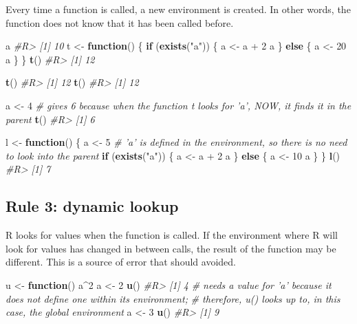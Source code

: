 \documentclass[]{book}
\newenvironment{Shaded}{}{}
\newcommand{\CommentTok}[1]{\textcolor[rgb]{0.38,0.63,0.69}{\textit{#1}}}
\newcommand{\ControlFlowTok}[1]{\textcolor[rgb]{0.00,0.44,0.13}{\textbf{#1}}}
\newcommand{\DecValTok}[1]{\textcolor[rgb]{0.25,0.63,0.44}{#1}}
\newcommand{\KeywordTok}[1]{\textcolor[rgb]{0.00,0.44,0.13}{\textbf{#1}}}
\newcommand{\NormalTok}[1]{#1}
\newcommand{\OperatorTok}[1]{\textcolor[rgb]{0.40,0.40,0.40}{#1}}
\newcommand{\StringTok}[1]{\textcolor[rgb]{0.25,0.44,0.63}{#1}}
\theoremstyle{definition}
\theoremstyle{definition}
\theoremstyle{definition}
\theoremstyle{remark}
\begin{document}
Every time a function is called, a new environment is created. In other
words, the function does not know that it has been called before.

\begin{Shaded}
\begin{Highlighting}[]
\NormalTok{a }
\CommentTok{#R> [1] 10}
\NormalTok{t <-}\StringTok{ }\ControlFlowTok{function}\NormalTok{() \{}
  \ControlFlowTok{if}\NormalTok{ (}\KeywordTok{exists}\NormalTok{(}\StringTok{"a"}\NormalTok{)) \{ }
\NormalTok{    a <-}\StringTok{ }\NormalTok{a }\OperatorTok{+}\StringTok{ }\DecValTok{2}
\NormalTok{    a}
\NormalTok{  \} }\ControlFlowTok{else}\NormalTok{ \{}
\NormalTok{    a <-}\StringTok{ }\DecValTok{20} 
\NormalTok{    a}
\NormalTok{  \} }
\NormalTok{\}}
\KeywordTok{t}\NormalTok{()}
\CommentTok{#R> [1] 12}

\KeywordTok{t}\NormalTok{()}
\CommentTok{#R> [1] 12}
\KeywordTok{t}\NormalTok{()}
\CommentTok{#R> [1] 12}

\NormalTok{a <-}\StringTok{ }\DecValTok{4}
\CommentTok{# gives 6 because when the function t looks for 'a', NOW, it finds it in the parent }
\KeywordTok{t}\NormalTok{() }
\CommentTok{#R> [1] 6}


\NormalTok{l <-}\StringTok{ }\ControlFlowTok{function}\NormalTok{() \{}
\NormalTok{  a <-}\StringTok{ }\DecValTok{5} 
  \CommentTok{# 'a' is defined in the environment, so there is no need to look into the parent }
  \ControlFlowTok{if}\NormalTok{ (}\KeywordTok{exists}\NormalTok{(}\StringTok{"a"}\NormalTok{)) \{ }
\NormalTok{    a <-}\StringTok{ }\NormalTok{a }\OperatorTok{+}\StringTok{ }\DecValTok{2}
\NormalTok{    a}
\NormalTok{  \} }\ControlFlowTok{else}\NormalTok{ \{}
\NormalTok{    a <-}\StringTok{ }\DecValTok{10} 
\NormalTok{    a}
\NormalTok{  \} }
\NormalTok{\}}
\KeywordTok{l}\NormalTok{()}
\CommentTok{#R> [1] 7}
\end{Highlighting}
\end{Shaded}

\hypertarget{rule-3-dynamic-lookup}{%
\subsection{Rule 3: dynamic lookup}\label{rule-3-dynamic-lookup}}

R looks for values when the function is called. If the environment where
R will look for values has changed in between calls, the result of the
function may be different. This is a source of error that should
avoided.

\begin{Shaded}
\begin{Highlighting}[]
\NormalTok{u <-}\StringTok{ }\ControlFlowTok{function}\NormalTok{() a}\OperatorTok{^}\DecValTok{2}
\NormalTok{a <-}\StringTok{ }\DecValTok{2}
\KeywordTok{u}\NormalTok{() }
\CommentTok{#R> [1] 4}
\CommentTok{# needs a value for 'a' because it does not define one within its environment; }
\CommentTok{# therefore, u() looks up to, in this case, the global environment}
\NormalTok{a <-}\StringTok{ }\DecValTok{3}
\KeywordTok{u}\NormalTok{()}
\CommentTok{#R> [1] 9}
\end{Highlighting}
\end{Shaded}
\end{document}
